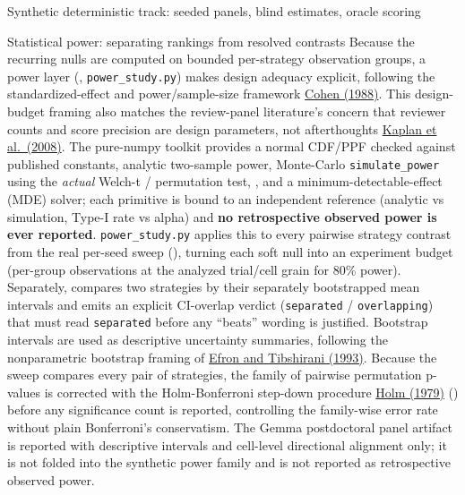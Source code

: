 \documentclass[
  ignorenonframetext,
]{beamer}
\begin{document}
\begin{frame}{Synthetic deterministic track:
seeded panels, blind estimates, oracle scoring}
\begin{block}{Statistical power: separating rankings from resolved
contrasts}
\protect{}\label{statistical-power-separating-rankings-from-resolved-contrasts}
Because the recurring nulls are computed on bounded per-strategy
observation groups, a power layer (,
\texttt{power\_study.py}) makes design adequacy explicit, following the
standardized-effect and power/sample-size framework
\href{https://archive.org/details/statisticalpower0000cohe}{Cohen
(1988)}. This design-budget framing also matches the review-panel
literature's concern that reviewer counts and score precision are design
parameters, not afterthoughts
\href{https://doi.org/10.1371/journal.pone.0002761}{Kaplan et
al.~(2008)}. The pure-numpy toolkit provides a normal CDF/PPF checked
against published constants, analytic two-sample power, Monte-Carlo
\texttt{simulate\_power} using the \emph{actual} Welch-t / permutation
test, , and a minimum-detectable-effect
(MDE) solver; each primitive is bound to an independent reference
(analytic vs simulation, Type-I rate vs alpha) and \textbf{no
retrospective observed power is ever reported}. \texttt{power\_study.py}
applies this to every pairwise strategy contrast from the real per-seed
sweep (), turning each soft null
into an experiment budget (per-group observations at the analyzed
trial/cell grain for 80\% power). Separately,
 compares two
strategies by their separately bootstrapped mean intervals and emits an
explicit CI-overlap verdict (\texttt{separated} / \texttt{overlapping})
that must read \texttt{separated} before any ``beats'' wording is
justified. Bootstrap intervals are used as descriptive uncertainty
summaries, following the nonparametric bootstrap framing of
\href{https://doi.org/10.1201/9780429246593}{Efron and Tibshirani
(1993)}. Because the sweep compares every pair of strategies, the family
of pairwise permutation p-values is corrected with the Holm-Bonferroni
step-down procedure \href{https://www.jstor.org/stable/4615733}{Holm
(1979)} () before any
significance count is reported, controlling the family-wise error rate
without plain Bonferroni's conservatism. The Gemma postdoctoral panel
artifact is reported with descriptive intervals and cell-level
directional alignment only; it is not folded into the synthetic power
family and is not reported as retrospective observed power.
\end{block}
\end{frame}
\end{document}
